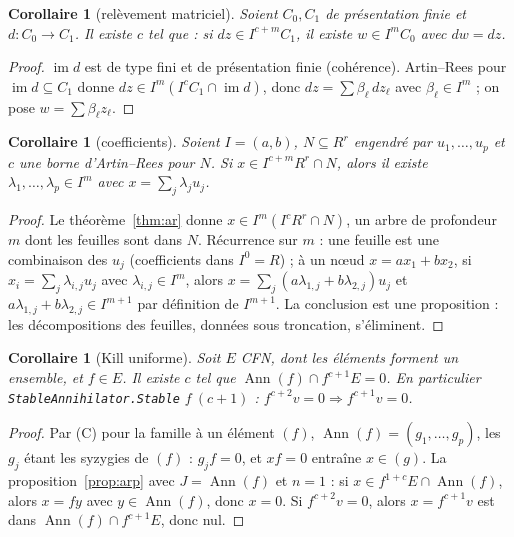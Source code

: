 \documentclass[11pt]{amsart}
\newtheorem{corollary}[theorem]{Corollaire}
\theoremstyle{definition}
\theoremstyle{remark}
\DeclareMathOperator{\Ann}{Ann}
\begin{document}
\begin{corollary}[relèvement matriciel]\label{cor:lift}
Soient $C_0,C_1$ de présentation finie et $d:C_0\to C_1$. Il existe $c$
tel que : si $dz\in I^{c+m}C_1$, il existe $w\in I^mC_0$ avec $dw=dz$.
\end{corollary}

\begin{proof}
$\operatorname{im}d$ est de type fini et de présentation finie
(cohérence). Artin--Rees pour $\operatorname{im}d\subseteq C_1$ donne
$dz\in I^m(I^cC_1\cap\operatorname{im}d)$, donc
$dz=\sum\beta_\ell\,dz_\ell$ avec $\beta_\ell\in I^m$ ; on pose
$w=\sum\beta_\ell z_\ell$.
\end{proof}

\begin{corollary}[coefficients]\label{cor:coef}
Soient $I=(a,b)$, $N\subseteq R^r$ engendré par $u_1,\dots,u_p$ et $c$ une
borne d'Artin--Rees pour $N$. Si $x\in I^{c+m}R^r\cap N$, alors il existe
$\lambda_1,\dots,\lambda_p\in I^m$ avec $x=\sum_j\lambda_ju_j$.
\end{corollary}

\begin{proof}
Le théorème~\ref{thm:ar} donne $x\in I^m(I^cR^r\cap N)$, un arbre de
profondeur $m$ dont les feuilles sont dans $N$. Récurrence sur $m$ : une
feuille est une combinaison des $u_j$ (coefficients dans $I^0=R$) ; à un
nœud $x=ax_1+bx_2$, si $x_i=\sum_j\lambda_{i,j}u_j$ avec
$\lambda_{i,j}\in I^m$, alors $x=\sum_j(a\lambda_{1,j}+b\lambda_{2,j})u_j$
et $a\lambda_{1,j}+b\lambda_{2,j}\in I^{m+1}$ par définition de $I^{m+1}$.
La conclusion est une proposition : les décompositions des feuilles,
données sous troncation, s'éliminent.
\end{proof}

\begin{corollary}[Kill uniforme]\label{cor:kill}
Soit $E$ CFN, dont les éléments forment un ensemble, et $f\in E$. Il
existe $c$ tel que $\Ann(f)\cap f^{c+1}E=0$. En particulier
\texttt{StableAnnihilator.Stable} $f\ (c+1)$ :
$f^{c+2}v=0\Rightarrow f^{c+1}v=0$.
\end{corollary}

\begin{proof}
Par (C) pour la famille à un élément $(f)$, $\Ann(f)=(g_1,\dots,g_p)$, les
$g_j$ étant les syzygies de $(f)$ : $g_jf=0$, et $xf=0$ entraîne
$x\in(g)$. La proposition~\ref{prop:arp} avec $J=\Ann(f)$ et $n=1$ :
si $x\in f^{1+c}E\cap\Ann(f)$, alors $x=fy$ avec $y\in\Ann(f)$, donc
$x=0$. Si $f^{c+2}v=0$, alors $x=f^{c+1}v$ est dans
$\Ann(f)\cap f^{c+1}E$, donc nul.
\end{proof}
\end{document}
